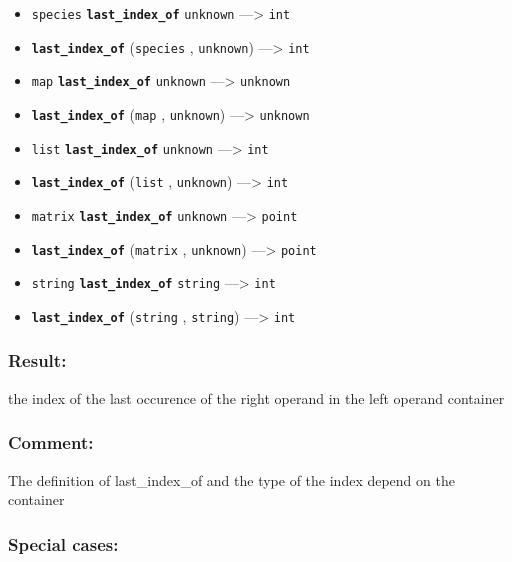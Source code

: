 \documentclass[]{book}
\providecommand{\tightlist}{%
  \setlength{\itemsep}{0pt}\setlength{\parskip}{0pt}}
\theoremstyle{definition}
\theoremstyle{definition}
\theoremstyle{definition}
\theoremstyle{remark}
\begin{document}
\begin{itemize}
\tightlist
\item
  \texttt{species} \textbf{\texttt{last\_index\_of}} \texttt{unknown}
  ---\textgreater{} \texttt{int}
\item
  \textbf{\texttt{last\_index\_of}} (\texttt{species} ,
  \texttt{unknown}) ---\textgreater{} \texttt{int}
\item
  \texttt{map} \textbf{\texttt{last\_index\_of}} \texttt{unknown}
  ---\textgreater{} \texttt{unknown}
\item
  \textbf{\texttt{last\_index\_of}} (\texttt{map} , \texttt{unknown})
  ---\textgreater{} \texttt{unknown}
\item
  \texttt{list} \textbf{\texttt{last\_index\_of}} \texttt{unknown}
  ---\textgreater{} \texttt{int}
\item
  \textbf{\texttt{last\_index\_of}} (\texttt{list} , \texttt{unknown})
  ---\textgreater{} \texttt{int}
\item
  \texttt{matrix} \textbf{\texttt{last\_index\_of}} \texttt{unknown}
  ---\textgreater{} \texttt{point}
\item
  \textbf{\texttt{last\_index\_of}} (\texttt{matrix} , \texttt{unknown})
  ---\textgreater{} \texttt{point}
\item
  \texttt{string} \textbf{\texttt{last\_index\_of}} \texttt{string}
  ---\textgreater{} \texttt{int}
\item
  \textbf{\texttt{last\_index\_of}} (\texttt{string} , \texttt{string})
  ---\textgreater{} \texttt{int}
\end{itemize}

\subsubsection{Result:}\label{result-307}

the index of the last occurence of the right operand in the left operand
container

\subsubsection{Comment:}\label{comment-57}

The definition of last\_index\_of and the type of the index depend on
the container

\subsubsection{Special cases:}\label{special-cases-85}
\end{document}
